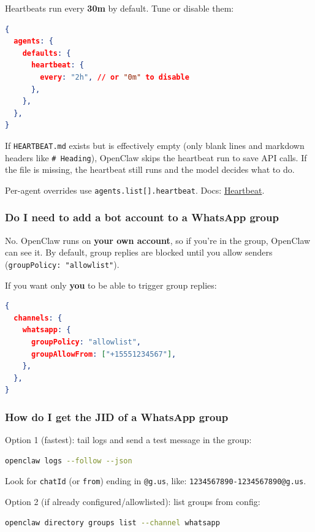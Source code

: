 Heartbeats run every \textbf{30m} by default. Tune or disable them:

\begin{lstlisting}[language=json]
{
  agents: {
    defaults: {
      heartbeat: {
        every: "2h", // or "0m" to disable
      },
    },
  },
}
\end{lstlisting}


If \texttt{HEARTBEAT.md} exists but is effectively empty (only blank lines and markdown
headers like \texttt{\# Heading}), OpenClaw skips the heartbeat run to save API calls.
If the file is missing, the heartbeat still runs and the model decides what to do.

Per-agent overrides use \texttt{agents.list[].heartbeat}. Docs: \href{/gateway/heartbeat}{Heartbeat}.

\subsubsection{Do I need to add a bot account to a WhatsApp group}


No. OpenClaw runs on \textbf{your own account}, so if you're in the group, OpenClaw can see it.
By default, group replies are blocked until you allow senders (\texttt{groupPolicy: "allowlist"}).

If you want only \textbf{you} to be able to trigger group replies:

\begin{lstlisting}[language=json]
{
  channels: {
    whatsapp: {
      groupPolicy: "allowlist",
      groupAllowFrom: ["+15551234567"],
    },
  },
}
\end{lstlisting}


\subsubsection{How do I get the JID of a WhatsApp group}


Option 1 (fastest): tail logs and send a test message in the group:

\begin{lstlisting}[language=bash]
openclaw logs --follow --json
\end{lstlisting}


Look for \texttt{chatId} (or \texttt{from}) ending in \texttt{@g.us}, like:
\texttt{1234567890-1234567890@g.us}.

Option 2 (if already configured/allowlisted): list groups from config:

\begin{lstlisting}[language=bash]
openclaw directory groups list --channel whatsapp
\end{lstlisting}



